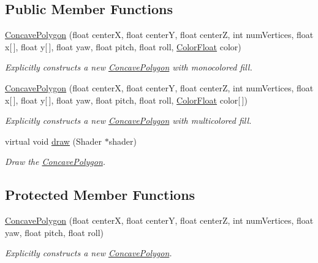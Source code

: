\subsection*{Public Member Functions}
\begin{DoxyCompactItemize}
\item 
\hyperlink{classtsgl_1_1_concave_polygon_afeb0acd4aaf557e8bcfe3fe33d713475}{Concave\+Polygon} (float centerX, float centerY, float centerZ, int num\+Vertices, float x\mbox{[}$\,$\mbox{]}, float y\mbox{[}$\,$\mbox{]}, float yaw, float pitch, float roll, \hyperlink{structtsgl_1_1_color_float}{Color\+Float} color)
\begin{DoxyCompactList}\small\item\em Explicitly constructs a new \hyperlink{classtsgl_1_1_concave_polygon}{Concave\+Polygon} with monocolored fill. \end{DoxyCompactList}\item 
\hyperlink{classtsgl_1_1_concave_polygon_a2493df66ce7bc24495f748b882e0ba76}{Concave\+Polygon} (float centerX, float centerY, float centerZ, int num\+Vertices, float x\mbox{[}$\,$\mbox{]}, float y\mbox{[}$\,$\mbox{]}, float yaw, float pitch, float roll, \hyperlink{structtsgl_1_1_color_float}{Color\+Float} color\mbox{[}$\,$\mbox{]})
\begin{DoxyCompactList}\small\item\em Explicitly constructs a new \hyperlink{classtsgl_1_1_concave_polygon}{Concave\+Polygon} with multicolored fill. \end{DoxyCompactList}\item 
virtual void \hyperlink{classtsgl_1_1_concave_polygon_adf288a6b60873a7ae5e599f63868da82}{draw} (Shader $\ast$shader)
\begin{DoxyCompactList}\small\item\em Draw the \hyperlink{classtsgl_1_1_concave_polygon}{Concave\+Polygon}. \end{DoxyCompactList}\end{DoxyCompactItemize}
\subsection*{Protected Member Functions}
\begin{DoxyCompactItemize}
\item 
\hyperlink{classtsgl_1_1_concave_polygon_a2440ccec9c6ece06b891b07bcf608868}{Concave\+Polygon} (float centerX, float centerY, float centerZ, int num\+Vertices, float yaw, float pitch, float roll)
\begin{DoxyCompactList}\small\item\em Explicitly constructs a new \hyperlink{classtsgl_1_1_concave_polygon}{Concave\+Polygon}. \end{DoxyCompactList}\end{DoxyCompactItemize}
